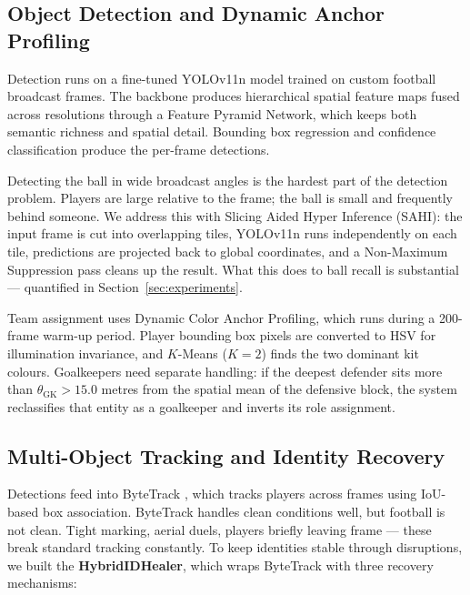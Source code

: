 \documentclass[conference]{IEEEtran}
\begin{document}
\subsection{Object Detection and Dynamic Anchor Profiling}

Detection runs on a fine-tuned YOLOv11n model \cite{ultralytics2023} trained on custom football broadcast frames. The backbone produces hierarchical spatial feature maps fused across resolutions through a Feature Pyramid Network, which keeps both semantic richness and spatial detail. Bounding box regression and confidence classification produce the per-frame detections.

Detecting the ball in wide broadcast angles is the hardest part of the detection problem. Players are large relative to the frame; the ball is small and frequently behind someone. We address this with Slicing Aided Hyper Inference (SAHI): the input frame is cut into overlapping tiles, YOLOv11n runs independently on each tile, predictions are projected back to global coordinates, and a Non-Maximum Suppression pass cleans up the result. What this does to ball recall is substantial --- quantified in Section~\ref{sec:experiments}.

Team assignment uses Dynamic Color Anchor Profiling, which runs during a 200-frame warm-up period. Player bounding box pixels are converted to HSV for illumination invariance, and $K$-Means ($K=2$) finds the two dominant kit colours. Goalkeepers need separate handling: if the deepest defender sits more than $\theta_{\text{GK}} > 15.0$ metres from the spatial mean of the defensive block, the system reclassifies that entity as a goalkeeper and inverts its role assignment.

\subsection{Multi-Object Tracking and Identity Recovery}

Detections feed into ByteTrack \cite{zhang2022}, which tracks players across frames using IoU-based box association. ByteTrack handles clean conditions well, but football is not clean. Tight marking, aerial duels, players briefly leaving frame --- these break standard tracking constantly. To keep identities stable through disruptions, we built the \textbf{HybridIDHealer}, which wraps ByteTrack with three recovery mechanisms:
\end{document}
